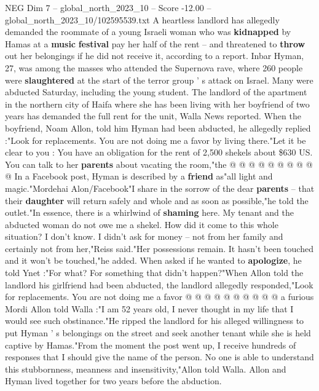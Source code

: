 \begin{textsample}{NEG Dim 7 – global\_north\_2023\_10 – Score -12.00 – global\_north\_2023\_10/102595539.txt}  \label{ex:f7_neg_024}
A heartless landlord has allegedly demanded the roommate of a young Israeli woman who was \textbf{kidnapped} by Hamas at a \textbf{music} \textbf{festival} pay her half of the rent -- and threatened to \textbf{throw} out her belongings if he did not receive it, according to a report.
Inbar Hyman, 27, was among the masses who attended the Supernova rave, where 260 people were \textbf{slaughtered} at the start of the terror group ' s attack on Israel.
Many were abducted Saturday, including the young student.
The landlord of the apartment in the northern city of Haifa where she has been living with her boyfriend of two years has demanded the full rent for the unit, Walla News reported.
When the boyfriend, Noam Allon, told him Hyman had been abducted, he allegedly replied :"Look for replacements.
You are not doing me a favor by living there."Let it be clear to you : You have an obligation for the rent of 2,500 shekels about \$630 US.
You can talk to her \textbf{parents} about vacating the room,"the @ @ @ @ @ @ @ @ @ @ In a Facebook post, Hyman is described by a \textbf{friend} as"all light and magic."Mordehai Alon/Facebook"I share in the sorrow of the dear \textbf{parents} -- that their \textbf{daughter} will return safely and whole and as soon as possible,"he told the outlet."In essence, there is a whirlwind of \textbf{shaming} here.
My tenant and the abducted woman do not owe me a shekel.
How did it come to this whole situation?
I don't know.
I didn't ask for money -- not from her family and certainly not from her,"Reiss said."Her possessions remain.
It hasn't been touched and it won't be touched,"he added.
When asked if he wanted to \textbf{apologize}, he told Ynet :"For what?
For something that didn't happen?"When Allon told the landlord his girlfriend had been abducted, the landlord allegedly responded,"Look for replacements.
You are not doing me a favor @ @ @ @ @ @ @ @ @ @ a furious Mordi Allon told Walla :"I am 52 years old, I never thought in my life that I would see such obstinance."He ripped the landlord for his alleged willingness to put Hyman ' s belongings on the street and seek another tenant while she is held captive by Hamas."From the moment the post went up, I receive hundreds of responses that I should give the name of the person.
No one is able to understand this stubbornness, meanness and insensitivity,"Allon told Walla.
Allon and Hyman lived together for two years before the abduction.

\end{textsample}
